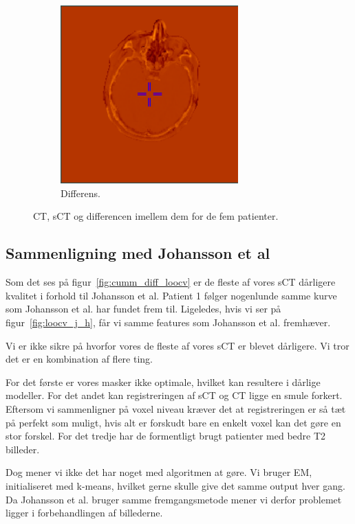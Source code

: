 \begin{figure}
\begin{subfigure}[b]{0.3\textwidth}
        \includegraphics[width=0.75\textwidth]{colager/loocv_ct/loocv_011030_sub.png}
        \caption{Differens.}
        \label{col:loocv_ct_pat5_sub}
    \end{subfigure}
    \caption{CT, sCT og differencen imellem dem for de fem patienter.}
    \label{col:loocv_ct}
\end{figure}

\subsection{Sammenligning med Johansson et al}


Som det ses på figur~\ref{fig:cumm_diff_loocv} er de fleste af vores sCT dårligere kvalitet i forhold til Johansson et al. Patient 1 følger nogenlunde samme kurve som Johansson et al. har fundet frem til. Ligeledes, hvis vi ser på figur~\ref{fig:loocv_j_h}, får vi samme features som Johansson et al. fremhæver.


Vi er ikke sikre på hvorfor vores de fleste af vores sCT er blevet dårligere. Vi tror det er en kombination af flere ting. 


For det første er vores masker ikke optimale, hvilket kan resultere i dårlige modeller. For det andet kan registreringen af sCT og CT ligge en smule forkert. Eftersom vi sammenligner på voxel niveau kræver det at registreringen er så tæt på perfekt som muligt, hvis alt er forskudt bare en enkelt voxel kan det gøre en stor forskel. For det tredje har de formentligt brugt patienter med bedre T2 billeder.


Dog mener vi ikke det har noget med algoritmen at gøre. Vi bruger EM, initialiseret med k-means, hvilket gerne skulle give det samme output hver gang. Da Johansson et al. bruger samme fremgangsmetode mener vi derfor problemet ligger i forbehandlingen af billederne.


